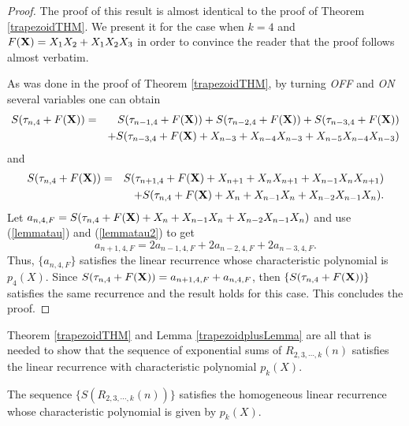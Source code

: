 \begin{proof}
The proof of this result is almost identical to the proof of Theorem \ref{trapezoidTHM}.  We present it for the case when $k=4$ and $F({\bf X}) = X_1X_2+X_1X_2X_3$ in order
 to convince the reader that the proof follows almost verbatim.
 
As was done in the proof of Theorem \ref{trapezoidTHM}, by turning {\it OFF} and {\it ON} several variables one can obtain
 \begin{eqnarray}
\label{lemmatau}
\nonumber
S(\tau_{n,4}+F({\bf X}))&=&S(\tau_{n-1,4}+F({\bf X}))+S(\tau_{n-2,4}+F({\bf X}))+S(\tau_{n-3,4}+F({\bf X}))\\
&&+S(\tau_{n-3,4}+F({\bf X})+X_{n-3}+X_{n-4}X_{n-3}+X_{n-5}X_{n-4}X_{n-3})
\end{eqnarray}
and
\begin{eqnarray}
\label{lemmatau2}
S(\tau_{n,4}+F({\bf X}))&=& S(\tau_{n+1,4}+F({\bf X})+X_{n+1}+X_{n}X_{n+1}+X_{n-1}X_{n}X_{n+1})\\\nonumber
&&+S(\tau_{n,4}+F({\bf X})+X_{n}+X_{n-1}X_{n}+X_{n-2}X_{n-1}X_{n}).
\end{eqnarray}
Let $a_{n,4,F}=S(\tau_{n,4}+F({\bf X})+X_{n}+X_{n-1}X_{n}+X_{n-2}X_{n-1}X_{n})$ and use (\ref{lemmatau}) and (\ref{lemmatau2}) to get
\begin{equation}
a_{n+1,4,F} = 2a_{n-1,4,F}+2a_{n-2,4,F}+2a_{n-3,4,F}.
\end{equation}
Thus, $\{a_{n,4,F}\}$ satisfies the linear recurrence whose characteristic polynomial is $p_4(X)$.  Since $S(\tau_{n,4}+F({\bf X}))=a_{n+1,4,F}+a_{n,4,F}$, then $\{S(\tau_{n,4}+F({\bf X}))\}$ satisfies
the same recurrence and the result holds for this case.  This concludes the proof.
\end{proof}

Theorem \ref{trapezoidTHM} and Lemma \ref{trapezoidplusLemma} are all that is needed to show that the sequence of exponential sums of $R_{2,3,\cdots, k}(n)$ satisfies the linear
recurrence with characteristic polynomial $p_k(X)$.

\begin{theorem}
 The sequence $\{S(R_{2,3,\cdots, k}(n))\}$ satisfies the homogeneous linear recurrence whose characteristic polynomial is given by $p_k(X)$. 
\end{theorem}

